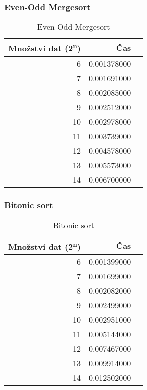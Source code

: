 \documentclass[12pt]{article}
\begin{document}
\subsubsection{Even-Odd Mergesort}
\begin{table}[H]
\begin{center}
\begin{tabular}{|r|r|r|}
\hline Množství dat (2\textsuperscript{n}) & Čas \\ \hline
6       &  0.001378000 \\ \hline
7       &  0.001691000 \\ \hline
8       &  0.002085000 \\ \hline
9       &  0.002512000 \\ \hline
10      &  0.002978000 \\ \hline
11      &  0.003739000 \\ \hline
12      &  0.004578000 \\ \hline
13      &  0.005573000 \\ \hline
14      &  0.006700000 \\ \hline
\end{tabular} 
\end{center}
\caption{Even-Odd Mergesort}
\end{table} 

\subsubsection{Bitonic sort}
\begin{table}[H]
\begin{center}
\begin{tabular}{|r|r|r|}
\hline Množství dat (2\textsuperscript{n}) & Čas \\ \hline
6       &  0.001399000 \\ \hline
7       &  0.001699000 \\ \hline
8       &  0.002082000 \\ \hline
9       &  0.002499000 \\ \hline
10      &  0.002951000 \\ \hline
11      &  0.005144000 \\ \hline
12      &  0.007467000 \\ \hline
13      &  0.009914000 \\ \hline
14      &  0.012502000 \\ \hline
\end{tabular} 
\end{center}
\caption{Bitonic sort}
\end{table} 
\end{document}
